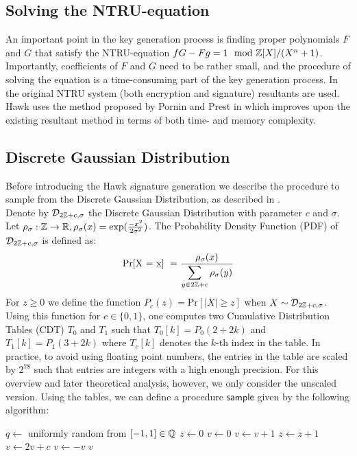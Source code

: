 \subsection{Solving the NTRU-equation}
An important point in the key generation process is finding proper polynomials $F$ and $G$ that satisfy the NTRU-equation $fG - Fg = 1 \mod \bb{Z}[X] / (X^n + 1)$.
Importantly, coefficients of $F$ and $G$ need to be rather small, and the procedure of solving the equation is a time-consuming part of the key generation process. 
In the original NTRU system (both encryption and signature) resultants are used. Hawk uses the method proposed by Pornin and Prest in \cite{PP19} which improves upon the existing
resultant method in terms of both time- and memory complexity.

\subsection{Discrete Gaussian Distribution}
Before introducing the Hawk signature generation we describe the procedure to sample from the Discrete Gaussian Distribution, as described in \cite{HawkSpec24}. \\
Denote by $\mathcal{D}_{2\mathbb{Z} + c, \sigma }$ the Discrete Gaussian Distribution with parameter $c$ and $\sigma$.
Let $\rho_{\sigma}: \mathbb{Z} \rightarrow \mathbb{R}, \rho_{\sigma}(x) = \exp(\frac{-x^2}{2\sigma^2})$.
The Probability Density Function (PDF) of $\mathcal{D}_{2\mathbb{Z} + c, \sigma }$ is defined as:
\[
    \text{Pr[X = x] } = \frac{\rho_{\sigma}(x)}{\mathlarger{\sum_{y \in 2\bb{Z} + c} \rho_{\sigma}(y)}}
\]
For $z \geq 0$ we define the function $P_c(z) = \text{Pr}[ |X| \geq z ]$ when $X \sim \mathcal{D}_{2\mathbb{Z}+c, \sigma}$.
Using this function for $c \in \{0, 1\}$, one computes two Cumulative Distribution Tables (CDT) $T_0$ and $T_1$
such that $T_0[k] = P_0(2+2k)$ and $T_1[k] = P_1(3+2k)$ where $T_c[k]$ denotes the $k$-th index in the table.
In practice, to avoid using floating point numbers, the entries in the table are scaled by $2^{78}$ such that 
entries are integers with a high enough precision. For this overview and later theoretical analysis, however, we only consider the unscaled version.
Using the tables, we can define a procedure $\mathsf{sample}$ given by the following algorithm:

\begin{algorithm}[H]\label{sample}
\caption{$\mathsf{sample}$}
\begin{algorithmic}[1]
    \State $q \gets$ uniformly random from $[-1, 1] \in \mathbb{Q}$
    \State $z \gets 0$
    \State $v \gets 0$
    \State $v \gets v + 1$
    \EndIf
    \State $z \gets z + 1$
    \State $v \gets 2v + c$
    \State $v \gets -v$
    \EndIf
    \EndWhile
    \State \Return $v$
\end{algorithmic}
\end{algorithm}

